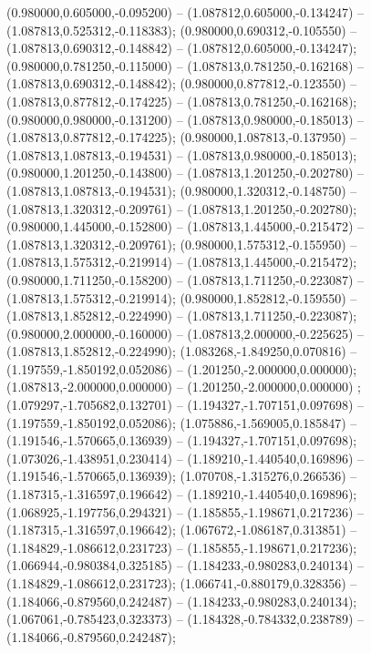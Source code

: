  (0.980000,0.605000,-0.095200) -- (1.087812,0.605000,-0.134247) -- (1.087813,0.525312,-0.118383);
 (0.980000,0.690312,-0.105550) -- (1.087813,0.690312,-0.148842) -- (1.087812,0.605000,-0.134247);
 (0.980000,0.781250,-0.115000) -- (1.087813,0.781250,-0.162168) -- (1.087813,0.690312,-0.148842);
 (0.980000,0.877812,-0.123550) -- (1.087813,0.877812,-0.174225) -- (1.087813,0.781250,-0.162168);
 (0.980000,0.980000,-0.131200) -- (1.087813,0.980000,-0.185013) -- (1.087813,0.877812,-0.174225);
 (0.980000,1.087813,-0.137950) -- (1.087813,1.087813,-0.194531) -- (1.087813,0.980000,-0.185013);
 (0.980000,1.201250,-0.143800) -- (1.087813,1.201250,-0.202780) -- (1.087813,1.087813,-0.194531);
 (0.980000,1.320312,-0.148750) -- (1.087813,1.320312,-0.209761) -- (1.087813,1.201250,-0.202780);
 (0.980000,1.445000,-0.152800) -- (1.087813,1.445000,-0.215472) -- (1.087813,1.320312,-0.209761);
 (0.980000,1.575312,-0.155950) -- (1.087813,1.575312,-0.219914) -- (1.087813,1.445000,-0.215472);
 (0.980000,1.711250,-0.158200) -- (1.087813,1.711250,-0.223087) -- (1.087813,1.575312,-0.219914);
 (0.980000,1.852812,-0.159550) -- (1.087813,1.852812,-0.224990) -- (1.087813,1.711250,-0.223087);
 (0.980000,2.000000,-0.160000) -- (1.087813,2.000000,-0.225625) -- (1.087813,1.852812,-0.224990);
 (1.083268,-1.849250,0.070816) -- (1.197559,-1.850192,0.052086) -- (1.201250,-2.000000,0.000000);
 (1.087813,-2.000000,0.000000) -- (1.201250,-2.000000,0.000000) ;
 (1.079297,-1.705682,0.132701) -- (1.194327,-1.707151,0.097698) -- (1.197559,-1.850192,0.052086);
 (1.075886,-1.569005,0.185847) -- (1.191546,-1.570665,0.136939) -- (1.194327,-1.707151,0.097698);
 (1.073026,-1.438951,0.230414) -- (1.189210,-1.440540,0.169896) -- (1.191546,-1.570665,0.136939);
 (1.070708,-1.315276,0.266536) -- (1.187315,-1.316597,0.196642) -- (1.189210,-1.440540,0.169896);
 (1.068925,-1.197756,0.294321) -- (1.185855,-1.198671,0.217236) -- (1.187315,-1.316597,0.196642);
 (1.067672,-1.086187,0.313851) -- (1.184829,-1.086612,0.231723) -- (1.185855,-1.198671,0.217236);
 (1.066944,-0.980384,0.325185) -- (1.184233,-0.980283,0.240134) -- (1.184829,-1.086612,0.231723);
 (1.066741,-0.880179,0.328356) -- (1.184066,-0.879560,0.242487) -- (1.184233,-0.980283,0.240134);
 (1.067061,-0.785423,0.323373) -- (1.184328,-0.784332,0.238789) -- (1.184066,-0.879560,0.242487);
